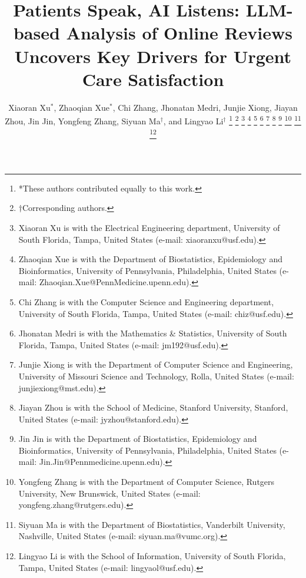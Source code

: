 \documentclass[journal,twoside,web]{ieeecolor}
\begin{document}
\title{Patients Speak, AI Listens: LLM-based Analysis of Online Reviews Uncovers Key Drivers for Urgent Care Satisfaction}

\author{
    Xiaoran Xu$^{*}$,
    Zhaoqian Xue$^{*}$,
    Chi Zhang,
    Jhonatan Medri,
    Junjie Xiong,
    Jiayan Zhou,
    Jin Jin,
    Yongfeng Zhang,
    Siyuan Ma$^{\dagger}$,
    and Lingyao Li$^{\dagger}$
    \thanks{*These authors contributed equally to this work.}
    \thanks{${\dagger}${Corresponding authors.}}
    \thanks{Xiaoran Xu is with the Electrical Engineering department, University of South Florida, Tampa, United States (e-mail: xiaoranxu@usf.edu).}
    \thanks{Zhaoqian Xue is with the Department of Biostatistics, Epidemiology and Bioinformatics, University of Pennsylvania, Philadelphia, United States (e-mail: Zhaoqian.Xue@PennMedicine.upenn.edu).}
    \thanks{Chi Zhang is with the Computer Science and Engineering department, University of South Florida, Tampa, United States (e-mail: chiz@usf.edu).}
    \thanks{Jhonatan Medri is with the Mathematics \& Statistics, University of South Florida, Tampa, United States (e-mail: jm192@usf.edu).}
    \thanks{Junjie Xiong is with the Department of Computer Science and Engineering, University of Missouri Science and Technology, Rolla, United States (e-mail: junjiexiong@mst.edu).}
    \thanks{Jiayan Zhou is with the School of Medicine, Stanford University, Stanford, United States (e-mail: jyzhou@stanford.edu).}
    \thanks{Jin Jin is with the Department of Biostatistics, Epidemiology and Bioinformatics, University of Pennsylvania, Philadelphia, United States (e-mail: Jin.Jin@Pennmedicine.upenn.edu).}
    \thanks{Yongfeng Zhang is with the Department of Computer Science, Rutgers University, New Brunswick, United States (e-mail: yongfeng.zhang@rutgers.edu).}
    \thanks{Siyuan Ma is with the Department of Biostatistics, Vanderbilt University, Nashville, United States (e-mail: siyuan.ma@vumc.org).}
    \thanks{Lingyao Li is with the School of Information, University of South Florida, Tampa, United States (e-mail: lingyaol@usf.edu).}
}

\maketitle
\end{document}
